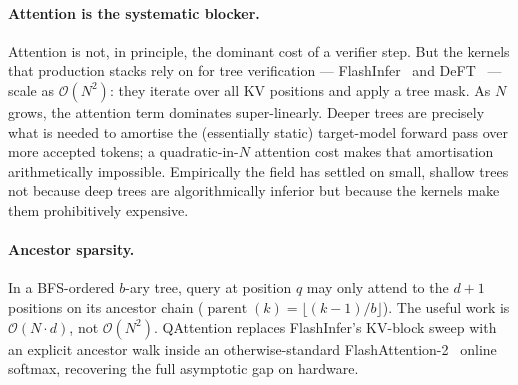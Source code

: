 \documentclass{article}
\newcommand{\method}{QAttention}
\newcommand{\bigO}[1]{\mathcal{O}(#1)}
\newcommand{\numtokens}{N}
\newcommand{\depth}{d}
\newcommand{\branching}{b}
\DeclareMathOperator{\parent}{parent}
\begin{document}
\paragraph{Attention is the systematic blocker.}
Attention is not, in principle, the dominant cost of a verifier step.
But the kernels that production stacks rely on for tree
verification --- FlashInfer~\cite{ye2025flashinfer} and
DeFT~\cite{yao2024deft} --- scale as $\bigO{\numtokens^2}$: they iterate
over all KV positions and apply a tree mask. As $\numtokens$ grows, the
attention term dominates super-linearly. Deeper trees are precisely
what is needed to amortise the (essentially static) target-model
forward pass over more accepted tokens; a quadratic-in-$\numtokens$
attention cost makes that amortisation arithmetically impossible.
Empirically the field has settled on small, shallow trees not because
deep trees are algorithmically inferior but because the kernels make
them prohibitively expensive.

\paragraph{Ancestor sparsity.}
In a BFS-ordered $\branching$-ary tree, query at position $q$ may only
attend to the $\depth{+}1$ positions on its ancestor chain
($\parent(k){=}\lfloor (k{-}1)/\branching\rfloor$). The useful work is
$\bigO{\numtokens \!\cdot\! \depth}$, not $\bigO{\numtokens^2}$.
\method{} replaces FlashInfer's KV-block sweep with an explicit
ancestor walk inside an otherwise-standard FlashAttention-2~\cite{dao2023flashattention2}
online softmax, recovering the full asymptotic gap on hardware.
\end{document}
